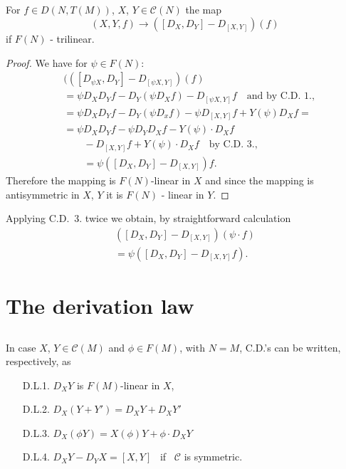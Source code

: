 \setcounter{subsection}{15}
\subsection{}\label{chap2:2.3.16}


\begin{lemma*}
For $f\in D(N,T(M))$, $X$, $Y\in\mathscr{C}(N)$ the map
$$
(X,Y,f)\to ([D_{X},D_{Y}]-D_{[X,Y]})(f)
$$
if $F(N)$ - trilinear.
\end{lemma*}

\begin{proof}
We have for $\psi\in F(N)$:
\begin{align*}
& (([D_{\psi X}, D_{Y}]-D_{[\psi X,Y]})(f)\\
& =\psi D_{X}D_{Y}f-D_{Y}(\psi D_{X}f)-D_{[\psi X,Y]}f\quad\text{and
    by C.D.~1.,}\\
&=\psi D_{X}D_{Y}f-D_{Y}(\psi D_{x}f)-\psi D_{[X,Y]}f+Y(\psi)D_{X}f=\\
&= \psi D_{X} D_{Y}f-\psi D_{Y}D_{X}f-Y(\psi)\cdot D_{X}f\\
&\qquad -D_{[X,Y]}f+Y(\psi)\cdot D_{X}f\quad\text{by C.D. 3.,}\\
&\qquad =\psi([D_{X},D_{Y}]-D_{[X,Y]})f.
\end{align*}\pageoriginale
Therefore the mapping is $F(N)$-linear in $X$ and since the mapping is
antisymmetric in $X$, $Y$ it is $F(N)$ - linear in $Y$.
\end{proof}

Applying C.D.~3. twice we obtain, by straightforward calculation
\begin{align*}
([D_{X},D_{Y}]-D_{[X,Y]})(\psi\cdot f)\\
=\psi([D_{X},D_{Y}]-D_{[X,Y]}f).
\end{align*}

\section{The derivation law}\label{chap2:sec4}

\subsection{}\label{chap2:2.4.1}
In case $X$, $Y\in \mathscr{C}(M)$ and $\phi\in F(M)$, with $N=M$,
C.D.'s can be written, respectively, as
\begin{itemize}
\item[D.L.1.] $D_{X}Y$ is $F(M)$-linear in $X$,

\item[D.L.2.] $D_{X}(Y+Y')=D_{X}Y+D_{X}Y'$

\item[D.L.3.] $D_{X}(\phi Y)=X(\phi)Y+\phi\cdot D_{X}Y$

\item[D.L.4.] $D_{X}Y-D_{Y}X=[X,Y]$ \ if \ $\mathscr{C}$ is symmetric.
\end{itemize}


